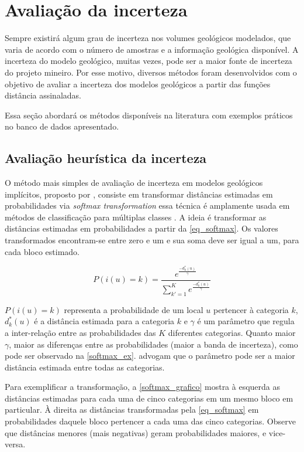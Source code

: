 \section{Avaliação da incerteza}

Sempre existirá algum grau de incerteza nos volumes geológicos modelados, que varia de acordo com o número de amostras e a informação geológica disponível. A incerteza do modelo geológico, muitas vezes, pode ser a maior fonte de incerteza do projeto mineiro. Por esse motivo, diversos métodos foram desenvolvidos com o objetivo de avaliar a incerteza dos modelos geológicos a partir das funções distância assinaladas.

Essa seção abordará os métodos disponíveis na literatura com exemplos práticos no banco de dados apresentado.

\subsection{Avaliação heurística da incerteza}\label{heuristic}

O método mais simples de avaliação de incerteza em modelos geológicos implícitos, proposto por , consiste em transformar distâncias estimadas em probabilidades via \textit{softmax transformation} essa técnica é amplamente usada em métodos de classificação para múltiplas classes \cite{mccullaghgeneralizedlinear}. A ideia é transformar as distâncias estimadas em probabilidades a partir da \autoref{eq_softmax}. Os valores transformados encontram-se entre zero e um e  sua soma deve ser igual a um, para cada bloco estimado.

\begin{equation}
	P(i(u)=k)=\frac{e^\frac{-d^*_k(u)}{\gamma}}{\sum_{k'=1}^{K}e^\frac{-d^*_k(u)}{\gamma}}
    \label{eq_softmax}
\end{equation}

$P(i(u)=k)$ representa a probabilidade de um local $u$ pertencer à categoria $k$, $d^*_k(u)$ é a distância estimada para a categoria $k$ e $\gamma$ é um parâmetro que regula a inter-relação entre as probabilidades das $K$ diferentes categorias. Quanto maior $\gamma$, maior as diferenças entre as probabilidades (maior a banda de incerteza), como pode ser observado na \autoref{softmax_ex}.  advogam que o parâmetro pode ser a maior distância estimada entre todas as categorias.

Para exemplificar a transformação, a \autoref{softmax_grafico} mostra à esquerda as distâncias estimadas para cada uma de cinco categorias em um mesmo bloco em particular. À direita as distâncias transformadas pela \autoref{eq_softmax} em probabilidades daquele bloco pertencer a cada uma das cinco categorias. Observe que distâncias menores (mais negativas) geram probabilidades maiores, e vice-versa.  

